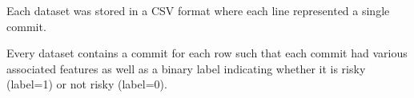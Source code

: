  Each dataset was stored in a CSV format where each line represented a single commit.
 
  Every dataset contains a commit for each row such that each commit had various associated features as well as a binary label indicating whether it is risky (label=1) or not risky (label=0). 